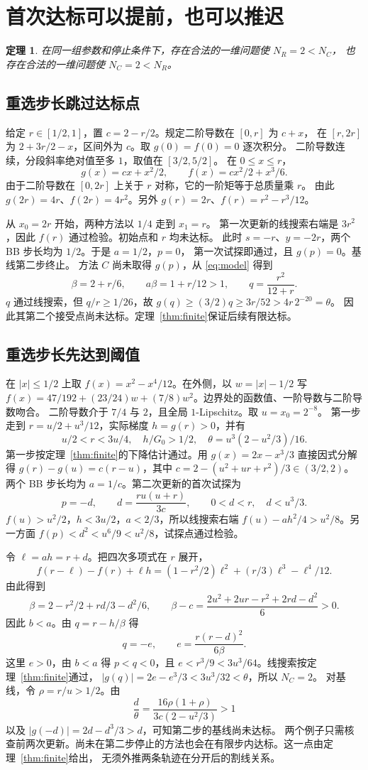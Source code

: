 \documentclass[UTF8,11pt]{ctexart}
\newtheorem{theorem}{定理}
\begin{document}
\section{首次达标可以提前，也可以推迟}
\begin{theorem}\label{thm:opposite}
在同一组参数和停止条件下，存在合法的一维问题使 $N_R=2<N_C$，
也存在合法的一维问题使 $N_C=2<N_R$。
\end{theorem}
\subsection{重选步长跳过达标点}
给定 $r\in[1/2,1]$，置 $c=2-r/2$。规定二阶导数在 $[0,r]$ 为 $c+x$，
在 $[r,2r]$ 为 $2+3r/2-x$，区间外为 $c$。取 $g(0)=f(0)=0$ 逐次积分。
二阶导数连续，分段斜率绝对值至多 $1$，取值在 $[3/2,5/2]$。
在 $0\le x\le r$，
\[
 g(x)=cx+x^2/2,\qquad f(x)=cx^2/2+x^3/6 .
\]
由于二阶导数在 $[0,2r]$ 上关于 $r$ 对称，它的一阶矩等于总质量乘 $r$。
由此 $g(2r)=4r$、$f(2r)=4r^2$。另外 $g(r)=2r$、$f(r)=r^2-r^3/12$。

从 $x_0=2r$ 开始，两种方法以 $1/4$ 走到 $x_1=r$。
第一次更新的线搜索右端是 $3r^2$，因此 $f(r)$ 通过检验。初始点和 $r$ 均未达标。
此时 $s=-r$、$y=-2r$，两个 BB 步长均为 $1/2$。于是 $a=1/2$，$p=0$，
第一次试探即通过，且 $g(p)=0$。基线第二步终止。
方法 $C$ 尚未取得 $g(p)$，从 \eqref{eq:model} 得到
\[
  \beta=2+r/6,\qquad a\beta=1+r/12>1,\qquad
  q=\frac{r^2}{12+r}.
\]
$q$ 通过线搜索，但 $q/r\ge1/26$，故 $g(q)\ge(3/2)q\ge3r/52>4r\,2^{-20}=\theta$。
因此其第二个接受点尚未达标。定理~\ref{thm:finite}保证后续有限达标。

\subsection{重选步长先达到阈值}
在 $|x|\le1/2$ 上取 $f(x)=x^2-x^4/12$。在外侧，以 $w=|x|-1/2$ 写
$f(x)=47/192+(23/24)w+(7/8)w^2$。边界处的函数值、一阶导数与二阶导数吻合。
二阶导数介于 $7/4$ 与 $2$，且全局 $1$-Lipschitz。取 $u=x_0=2^{-8}$。
第一步走到 $r=u/2+u^3/12$，实际梯度 $h=g(r)>0$，并有
\[
    u/2<r<3u/4,\quad h/G_0>1/2,\quad
    \theta=u^3(2-u^2/3)/16 .
\]
第一步按定理~\ref{thm:finite}的下降估计通过。用 $g(x)=2x-x^3/3$ 直接因式分解得
$g(r)-g(u)=c(r-u)$，其中 $c=2-(u^2+ur+r^2)/3\in(3/2,2)$。
两个 BB 步长均为 $a=1/c$。第二次更新的首次试探为
\[
     p=-d,\qquad d=\frac{ru(u+r)}{3c},\qquad 0<d<r,\quad d<u^3/3 .
\]
$f(u)>u^2/2$，$h<3u/2$，$a<2/3$，所以线搜索右端
$f(u)-ah^2/4>u^2/8$。另一方面 $f(p)<d^2<u^6/9<u^2/8$，试探点通过检验。

令 $\ell=ah=r+d$。把四次多项式在 $r$ 展开，
\[
 f(r-\ell)-f(r)+\ell h
 = (1-r^2/2)\ell^2+(r/3)\ell^3-\ell^4/12 .
\]
由此得到
\[
 \beta=2-r^2/2+rd/3-d^2/6,\qquad
 \beta-c=\frac{2u^2+2ur-r^2+2rd-d^2}{6}>0 .
\]
因此 $b<a$。由 $q=r-h/\beta$ 得
\[
    q=-e,\qquad e=\frac{r(r-d)^2}{6\beta}.
\]
这里 $e>0$，由 $b<a$ 得 $p<q<0$，且 $e<r^3/9<3u^3/64$。线搜索按定理~\ref{thm:finite}通过，
$|g(q)|=2e-e^3/3<3u^3/32<\theta$，所以 $N_C=2$。
对基线，令 $\rho=r/u>1/2$。由
\[
 \frac{d}{\theta}=\frac{16\rho(1+\rho)}{3c(2-u^2/3)}>1
\]
以及 $|g(-d)|=2d-d^3/3>d$，可知第二步的基线尚未达标。
两个例子只需核查前两次更新。尚未在第二步停止的方法也会在有限步内达标。这一点由定理~\ref{thm:finite}给出，
无须外推两条轨迹在分开后的割线关系。
\end{document}

